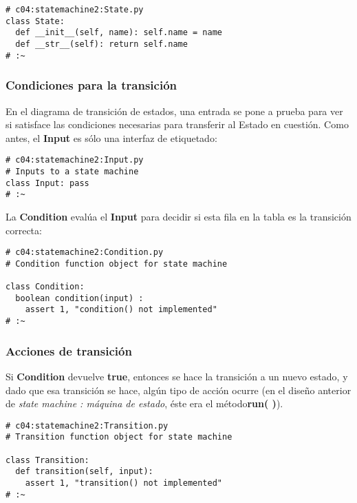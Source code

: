  \begin{lstlisting}
# c04:statemachine2:State.py 
class State: 
  def __init__(self, name): self.name = name 
  def __str__(self): return self.name  
# :~  
 \end{lstlisting}
  
  
\subsubsection*{Condiciones para la transición}
\label{subsubsec:cplt}

En el diagrama de transición de estados, una entrada se pone a prueba para ver si satisface las condiciones necesarias para transferir al Estado en cuestión. Como antes, el \textbf{Input} es sólo una interfaz de etiquetado:     \newline

\begin{lstlisting}
# c04:statemachine2:Input.py 
# Inputs to a state machine 
class Input: pass 
# :~ 
\end{lstlisting}

La \textbf{Condition} evalúa el \textbf{Input} para decidir si esta fila en la tabla es la transición correcta: \newline

  \begin{lstlisting}
# c04:statemachine2:Condition.py 
# Condition function object for state machine 

class Condition: 
  boolean condition(input) :  
    assert 1, "condition() not implemented" 
# :~ 
\end{lstlisting}

\subsubsection*{Acciones de transición}
\label{subsubsec:adt}


Si \textbf{Condition} devuelve \textbf{true}, entonces se hace la transición a un nuevo estado, y dado que esa transición se hace, algún tipo de acción ocurre (en el diseño anterior de \textit{state machine : máquina de estado}, éste era el método\textbf{run( )}).     \newline

\begin{lstlisting}
# c04:statemachine2:Transition.py 
# Transition function object for state machine 

class Transition: 
  def transition(self, input): 
    assert 1, "transition() not implemented" 
# :~ 
\end{lstlisting}


